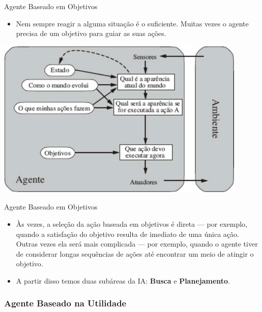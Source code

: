 \documentclass{libs/ufc_format}
\begin{document}
\begin{frame}{Agente Baseado em Objetivos}
    \begin{itemize}
        \justifying
        \item Nem sempre reagir a alguma situação é o suficiente. Muitas vezes o agente precisa de um objetivo para guiar as suas ações.
    \end{itemize}
    \centering
    \includegraphics[width=0.9\textwidth]{figuras/figura06}
\end{frame}

\begin{frame}{Agente Baseado em Objetivos}
    \begin{itemize}
        \justifying
        \item Às vezes, a seleção da ação baseada em objetivos é direta --- por exemplo, quando a satisfação do objetivo resulta de imediato de uma única ação. Outras vezes ela será mais complicada --- por exemplo, quando o agente tiver de considerar longas sequências de ações até encontrar um meio de atingir o objetivo.
        \item A partir disso temos duas subáreas da IA: \textbf{Busca} e \textbf{Planejamento}.
    \end{itemize}
\end{frame}

\subsubsection{Agente Baseado na Utilidade}
\end{document}
